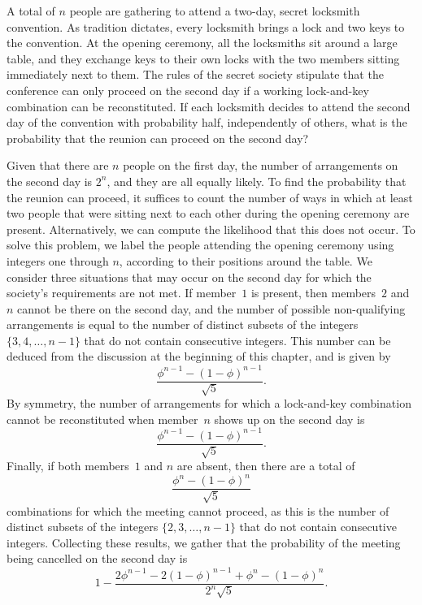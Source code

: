 \begin{example}
A total of $n$ people are gathering to attend a two-day, secret locksmith convention.
As tradition dictates, every locksmith brings a lock and two keys to the convention.
At the opening ceremony, all the locksmiths sit around a large table, and they exchange keys to their own locks with the two members sitting immediately next to them.
The rules of the secret society stipulate that the conference can only proceed on the second day if a working lock-and-key combination can be reconstituted.
If each locksmith decides to attend the second day of the convention with probability half, independently of others, what is the probability that the reunion can proceed on the second day?

Given that there are $n$ people on the first day, the number of arrangements on the second day is $2^n$, and they are all equally likely.
To find the probability that the reunion can proceed, it suffices to count the number of ways in which at least two people that were sitting next to each other during the opening ceremony are present.
Alternatively, we can compute the likelihood that this does not occur.
To solve this problem, we label the people attending the opening ceremony using integers one through $n$, according to their positions around the table.
We consider three situations that may occur on the second day for which the society's requirements are not met.
If member~$1$ is present, then members~$2$ and $n$ cannot be there on the second day, and the number of possible non-qualifying arrangements is equal to the number of distinct subsets of the integers $\{3, 4,\ldots, n-1\}$ that do not contain consecutive integers.
This number can be deduced from the discussion at the beginning of this chapter, and is given by
\begin{equation*}
\frac{ \phi^{n-1} - (1 - \phi)^{n-1} }{ \sqrt{5} } .
\end{equation*}
By symmetry, the number of arrangements for which a lock-and-key combination cannot be reconstituted when member~$n$ shows up on the second day is
\begin{equation*}
\frac{ \phi^{n-1} - (1 - \phi)^{n-1} }{ \sqrt{5} } .
\end{equation*}
Finally, if both members~$1$ and $n$ are absent, then there are a total of
\begin{equation*}
\frac{ \phi^{n} - (1 - \phi)^{n} }{ \sqrt{5} }
\end{equation*}
combinations for which the meeting cannot proceed, as this is the number of distinct subsets of the integers $\{ 2, 3, \ldots, n-1 \}$ that do not contain consecutive integers.
Collecting these results, we gather that the probability of the meeting being cancelled on the second day is
\begin{equation*}
1 - \frac{ 2 \phi^{n-1} - 2 (1 - \phi)^{n-1}
+ \phi^{n} - (1 - \phi)^{n} }{2^n \sqrt{5}} .
\end{equation*}
\end{example}



